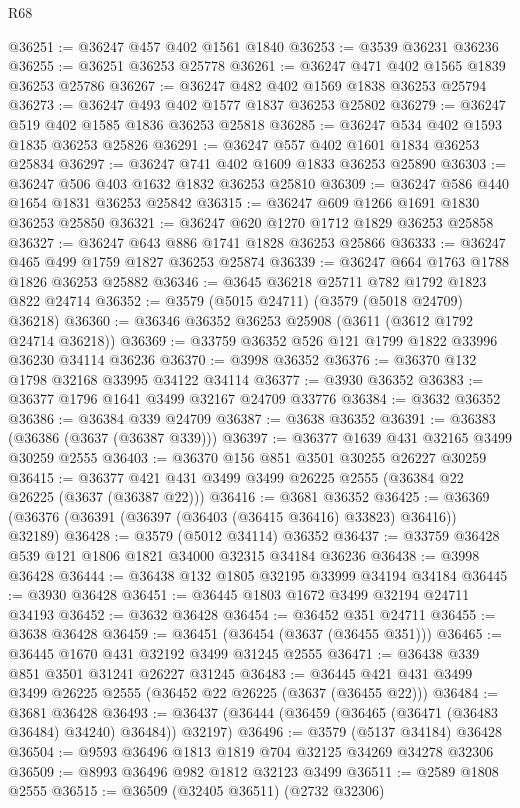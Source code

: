 \begin{lexlean}{R68}
\begin{coremodule}
@36251 := @36247 @457 @402 @1561 @1840
@36253 := @3539 @36231 @36236
@36255 := @36251 @36253 @25778
@36261 := @36247 @471 @402 @1565 @1839 @36253 @25786
@36267 := @36247 @482 @402 @1569 @1838 @36253 @25794
@36273 := @36247 @493 @402 @1577 @1837 @36253 @25802
@36279 := @36247 @519 @402 @1585 @1836 @36253 @25818
@36285 := @36247 @534 @402 @1593 @1835 @36253 @25826
@36291 := @36247 @557 @402 @1601 @1834 @36253 @25834
@36297 := @36247 @741 @402 @1609 @1833 @36253 @25890
@36303 := @36247 @506 @403 @1632 @1832 @36253 @25810
@36309 := @36247 @586 @440 @1654 @1831 @36253 @25842
@36315 := @36247 @609 @1266 @1691 @1830 @36253 @25850
@36321 := @36247 @620 @1270 @1712 @1829 @36253 @25858
@36327 := @36247 @643 @886 @1741 @1828 @36253 @25866
@36333 := @36247 @465 @499 @1759 @1827 @36253 @25874
@36339 := @36247 @664 @1763 @1788 @1826 @36253 @25882
@36346 := @3645 @36218 @25711 @782 @1792 @1823 @822 @24714
@36352 := @3579 (@5015 @24711) (@3579 (@5018 @24709) @36218)
@36360 := @36346 @36352 @36253 @25908 (@3611 (@3612 @1792 @24714 @36218))
@36369 := @33759 @36352 @526 @121 @1799 @1822 @33996 @36230 @34114 @36236
@36370 := @3998 @36352
@36376 := @36370 @132 @1798 @32168 @33995 @34122 @34114
@36377 := @3930 @36352
@36383 := @36377 @1796 @1641 @3499 @32167 @24709 @33776
@36384 := @3632 @36352
@36386 := @36384 @339 @24709
@36387 := @3638 @36352
@36391 := @36383 (@36386 (@3637 (@36387 @339)))
@36397 := @36377 @1639 @431 @32165 @3499 @30259 @2555
@36403 := @36370 @156 @851 @3501 @30255 @26227 @30259
@36415 := @36377 @421 @431 @3499 @3499 @26225 @2555 (@36384 @22 @26225 (@3637 (@36387 @22)))
@36416 := @3681 @36352
@36425 := @36369 (@36376 (@36391 (@36397 (@36403 (@36415 @36416) @33823) @36416)) @32189)
@36428 := @3579 (@5012 @34114) @36352
@36437 := @33759 @36428 @539 @121 @1806 @1821 @34000 @32315 @34184 @36236
@36438 := @3998 @36428
@36444 := @36438 @132 @1805 @32195 @33999 @34194 @34184
@36445 := @3930 @36428
@36451 := @36445 @1803 @1672 @3499 @32194 @24711 @34193
@36452 := @3632 @36428
@36454 := @36452 @351 @24711
@36455 := @3638 @36428
@36459 := @36451 (@36454 (@3637 (@36455 @351)))
@36465 := @36445 @1670 @431 @32192 @3499 @31245 @2555
@36471 := @36438 @339 @851 @3501 @31241 @26227 @31245
@36483 := @36445 @421 @431 @3499 @3499 @26225 @2555 (@36452 @22 @26225 (@3637 (@36455 @22)))
@36484 := @3681 @36428
@36493 := @36437 (@36444 (@36459 (@36465 (@36471 (@36483 @36484) @34240) @36484)) @32197)
@36496 := @3579 (@5137 @34184) @36428
@36504 := @9593 @36496 @1813 @1819 @704 @32125 @34269 @34278 @32306
@36509 := @8993 @36496 @982 @1812 @32123 @3499
@36511 := @2589 @1808 @2555
@36515 := @36509 (@32405 @36511) (@2732 @32306)

\end{coremodule}
\end{lexlean}
